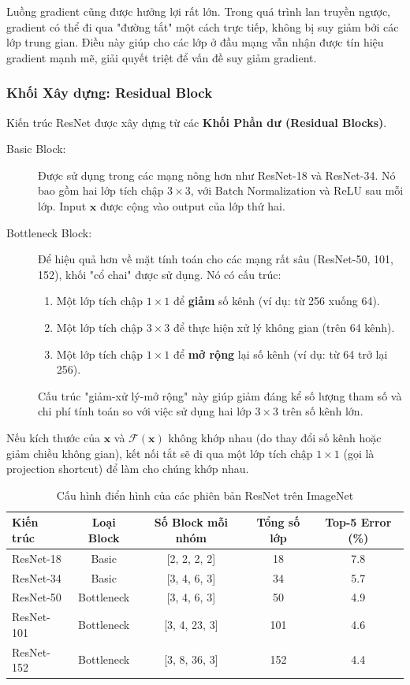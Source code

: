 Luồng gradient cũng được hưởng lợi rất lớn. Trong quá trình lan truyền ngược, gradient có thể đi qua "đường tắt" một cách trực tiếp, không bị suy giảm bởi các lớp trung gian. Điều này giúp cho các lớp ở đầu mạng vẫn nhận được tín hiệu gradient mạnh mẽ, giải quyết triệt để vấn đề suy giảm gradient.

\subsubsection{Khối Xây dựng: Residual Block}
\label{subsubsec:resnet_blocks}
Kiến trúc ResNet được xây dựng từ các \textbf{Khối Phần dư (Residual Blocks)}.
\begin{description}
	\item[Basic Block:] Được sử dụng trong các mạng nông hơn như ResNet-18 và ResNet-34. Nó bao gồm hai lớp tích chập $3 \times 3$, với Batch Normalization và ReLU sau mỗi lớp. Input $\mathbf{x}$ được cộng vào output của lớp thứ hai.
	
	\item[Bottleneck Block:] Để hiệu quả hơn về mặt tính toán cho các mạng rất sâu (ResNet-50, 101, 152), khối "cổ chai" được sử dụng. Nó có cấu trúc:
	\begin{enumerate}
		\item Một lớp tích chập $1 \times 1$ để \textbf{giảm} số kênh (ví dụ: từ 256 xuống 64).
		\item Một lớp tích chập $3 \times 3$ để thực hiện xử lý không gian (trên 64 kênh).
		\item Một lớp tích chập $1 \times 1$ để \textbf{mở rộng} lại số kênh (ví dụ: từ 64 trở lại 256).
	\end{enumerate}
	Cấu trúc "giảm-xử lý-mở rộng" này giúp giảm đáng kể số lượng tham số và chi phí tính toán so với việc sử dụng hai lớp $3 \times 3$ trên số kênh lớn.
\end{description}
Nếu kích thước của $\mathbf{x}$ và $\mathcal{F}(\mathbf{x})$ không khớp nhau (do thay đổi số kênh hoặc giảm chiều không gian), kết nối tắt sẽ đi qua một lớp tích chập $1 \times 1$ (gọi là projection shortcut) để làm cho chúng khớp nhau.

\begin{table}[H]
	\centering
	\caption{Cấu hình điển hình của các phiên bản ResNet trên ImageNet}
	\label{tab:resnet_config}
	\begin{tabular}{lcccc}
		\toprule
		\textbf{Kiến trúc} & \textbf{Loại Block} & \textbf{Số Block mỗi nhóm} & \textbf{Tổng số lớp} & \textbf{Top-5 Error (\%)} \\
		\midrule
		ResNet-18 & Basic & [2, 2, 2, 2] & 18 & 7.8 \\
		ResNet-34 & Basic & [3, 4, 6, 3] & 34 & 5.7 \\
		ResNet-50 & Bottleneck & [3, 4, 6, 3] & 50 & 4.9 \\
		ResNet-101 & Bottleneck & [3, 4, 23, 3] & 101 & 4.6 \\
		ResNet-152 & Bottleneck & [3, 8, 36, 3] & 152 & 4.4 \\
		\bottomrule
	\end{tabular}
\end{table}

